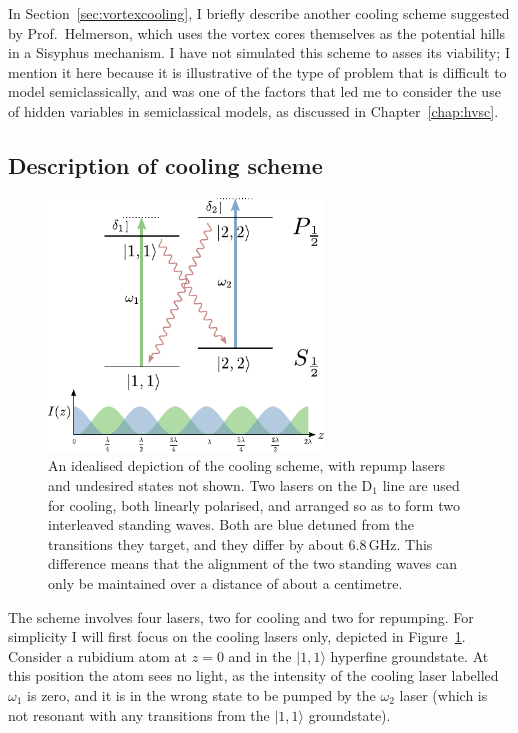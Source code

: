 In Section~\ref{sec:vortexcooling}, I briefly describe another cooling scheme suggested by Prof.~Helmerson, which uses the vortex cores themselves as the potential hills in a Sisyphus mechanism. I have not simulated this scheme to asses its viability; I mention it here because it is illustrative of the type of problem that is difficult to model semiclassically, and was one of the factors that led me to consider the use of hidden variables in semiclassical models, as discussed in Chapter~\ref{chap:hvsc}.


\subsection{Description of cooling scheme}

\begin{figure}
\begin{center}
\includegraphics[width=0.65\textwidth]{figures/unsorted/cooling_simplified.pdf}
\caption{\label{fig:cooling_simplified}An idealised depiction of the cooling scheme, with repump lasers and undesired states not shown. Two lasers on the D$_1$ line are used for cooling, both linearly polarised, and arranged so as to form two interleaved standing waves. Both are blue detuned from the transitions they target, and they differ by about $6.8\,$GHz. This difference means that the alignment of the two standing waves can only be maintained over a distance of about a centimetre.}
\end{center}
\end{figure}

The scheme involves four lasers, two for cooling and two for repumping. For simplicity I will first focus on the cooling lasers only, depicted in Figure~\ref{fig:cooling_simplified}. Consider a rubidium atom at $z=0$ and in the $|1,1\rangle$ hyperfine groundstate. At this position the atom sees no light, as the intensity of the cooling laser labelled $\omega_1$ is zero, and it is in the wrong state to be pumped by the $\omega_2$ laser (which is not resonant with any transitions from the $|1,1\rangle$ groundstate).

